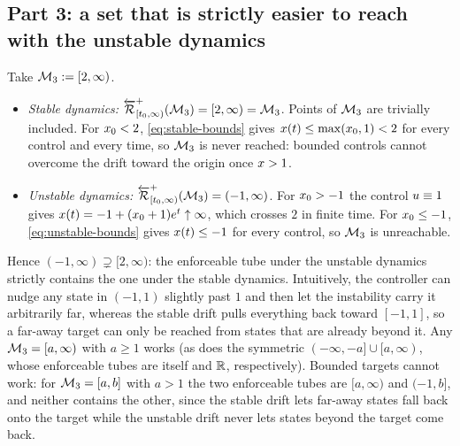 \subsection*{Part 3: a set that is strictly easier to reach with the unstable dynamics}

Take $\mathcal{M}_3:=[2,\infty)$.
\begin{itemize}[itemsep=2pt]
\item \emph{Stable dynamics:} ${\overleftarrow{{\mathcal{R}}}}^+_{[{t}_0,\infty)}(\mathcal{M}_3)=[2,\infty)=\mathcal{M}_3$. Points of $\mathcal{M}_3$ are
      trivially included. For ${x}_0<2$, \eqref{eq:stable-bounds} gives
      ${x}({t})\le\max({x}_0,1)<2$ for every control and every time, so $\mathcal{M}_3$ is never
      reached: bounded controls cannot overcome the drift toward the origin once ${x}>1$.
\item \emph{Unstable dynamics:} ${\overleftarrow{{\mathcal{R}}}}^+_{[{t}_0,\infty)}(\mathcal{M}_3)=(-1,\infty)$. For ${x}_0>-1$ the control
      ${u}\equiv1$ gives ${x}({t})=-1+({x}_0+1)e^{{t}}\uparrow\infty$, which crosses $2$
      in finite time. For ${x}_0\le-1$, \eqref{eq:unstable-bounds} gives ${x}({t})\le-1$
      for every control, so $\mathcal{M}_3$ is unreachable.
\end{itemize}
Hence $(-1,\infty)\supsetneq[2,\infty)$: the enforceable tube under the unstable dynamics strictly
contains the one under the stable dynamics. Intuitively, the controller can nudge any state in
$(-1,1)$ slightly past $1$ and then let the instability carry it arbitrarily far, whereas the stable
drift pulls everything back toward $[-1,1]$, so a far-away target can only be reached from states
that are already beyond it. Any $\mathcal{M}_3=[a,\infty)$ with $a\ge1$ works (as does the symmetric
$(-\infty,-a]\cup[a,\infty)$, whose enforceable tubes are itself and $\mathbb{R}$, respectively). Bounded
targets cannot work: for $\mathcal{M}_3=[a,b]$ with $a>1$ the two enforceable tubes are $[a,\infty)$ and
$(-1,b]$, and neither contains the other, since the stable drift lets far-away states fall back onto
the target while the unstable drift never lets states beyond the target come back.
